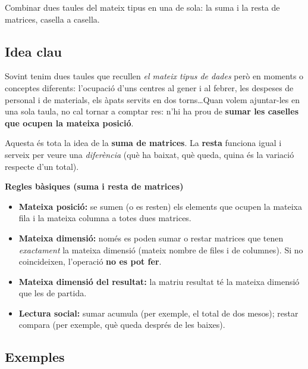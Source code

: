 %
{Combinar dues taules del mateix tipus en una de sola: la suma i la resta de matrices, casella a casella.}

\subsection{Idea clau}

Sovint tenim dues taules que recullen \emph{el mateix tipus de dades} però en
moments o conceptes diferents: l'ocupació d'uns centres al gener i al febrer, les
despeses de personal i de materials, els àpats servits en dos torns\dots Quan
volem ajuntar-les en una sola taula, no cal tornar a comptar res: n'hi ha prou de
\textbf{sumar les caselles que ocupen la mateixa posició}.

Aquesta és tota la idea de la \textbf{suma de matrices}. La \textbf{resta}
funciona igual i serveix per veure una \emph{diferència} (què ha baixat, què
queda, quina és la variació respecte d'un total).

\begin{idea}
\textbf{Regles bàsiques (suma i resta de matrices)}
\begin{itemize}[leftmargin=1.4em, itemsep=2pt]
  \item \textbf{Mateixa posició:} se sumen (o es resten) els elements que ocupen
        la mateixa fila i la mateixa columna a totes dues matrices.
  \item \textbf{Mateixa dimensió:} només es poden sumar o restar matrices que
        tenen \emph{exactament} la mateixa dimensió (mateix nombre de files i de
        columnes). Si no coincideixen, l'operació \textbf{no es pot fer}.
  \item \textbf{Mateixa dimensió del resultat:} la matriu resultat té la mateixa
        dimensió que les de partida.
  \item \textbf{Lectura social:} sumar acumula (per exemple, el total de dos
        mesos); restar compara (per exemple, què queda després de les baixes).
\end{itemize}
\end{idea}

\subsection{Exemples}

